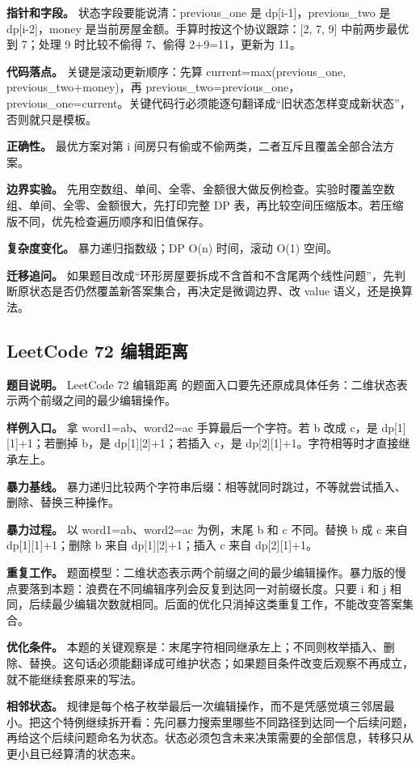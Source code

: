 \textbf{指针和字段。} 状态字段要能说清：previous\_one 是 dp[i-1]，previous\_two 是 dp[i-2]，money 是当前房屋金额。手算时按这个协议跟踪：[2, 7, 9] 中前两步最优到 7；处理 9 时比较不偷得 7、偷得 2+9=11，更新为 11。

\textbf{代码落点。} 关键是滚动更新顺序：先算 current=max(previous\_one, previous\_two+money)，再 previous\_two=previous\_one，previous\_one=current。关键代码行必须能逐句翻译成“旧状态怎样变成新状态”，否则就只是模板。

\textbf{正确性。} 最优方案对第 i 间房只有偷或不偷两类，二者互斥且覆盖全部合法方案。

\textbf{边界实验。} 先用空数组、单间、全零、金额很大做反例检查。实验时覆盖空数组、单间、全零、金额很大，先打印完整 DP 表，再比较空间压缩版本。若压缩版不同，优先检查遍历顺序和旧值保存。

\textbf{复杂度变化。} 暴力递归指数级；DP O(n) 时间，滚动 O(1) 空间。

\textbf{迁移追问。} 如果题目改成“环形房屋要拆成不含首和不含尾两个线性问题”，先判断原状态是否仍然覆盖新答案集合，再决定是微调边界、改 value 语义，还是换算法。

\subsection{LeetCode 72 编辑距离}

\textbf{题目说明。} LeetCode 72 编辑距离 的题面入口要先还原成具体任务：二维状态表示两个前缀之间的最少编辑操作。

\textbf{样例入口。} 拿 word1=ab、word2=ac 手算最后一个字符。若 b 改成 c，是 dp[1][1]+1；若删掉 b，是 dp[1][2]+1；若插入 c，是 dp[2][1]+1。字符相等时才直接继承左上。

\textbf{暴力基线。} 暴力递归比较两个字符串后缀：相等就同时跳过，不等就尝试插入、删除、替换三种操作。

\textbf{暴力过程。} 以 word1=ab、word2=ac 为例，末尾 b 和 c 不同。替换 b 成 c 来自 dp[1][1]+1；删除 b 来自 dp[1][2]+1；插入 c 来自 dp[2][1]+1。

\textbf{重复工作。} 题面模型：二维状态表示两个前缀之间的最少编辑操作。暴力版的慢点要落到本题：浪费在不同编辑序列会反复到达同一对前缀长度。只要 i 和 j 相同，后续最少编辑次数就相同。后面的优化只消掉这类重复工作，不能改变答案集合。

\textbf{优化条件。} 本题的关键观察是：末尾字符相同继承左上；不同则枚举插入、删除、替换。这句话必须能翻译成可维护状态；如果题目条件改变后观察不再成立，就不能继续套原来的写法。

\textbf{相邻状态。} 规律是每个格子枚举最后一次编辑操作，而不是凭感觉填三邻居最小。把这个特例继续拆开看：先问暴力搜索里哪些不同路径到达同一个后续问题，再给这个后续问题命名为状态。状态必须包含未来决策需要的全部信息，转移只从更小且已经算清的状态来。

